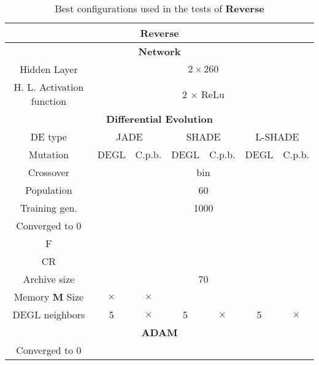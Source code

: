 \begin{table}[!h]
	\centering
	\begin{tabular}{|c|c|c|c|c|c|c|}
		\hline
		\multicolumn{7}{|c|}{\textbf{Reverse}} \\ \hline \hline
		\multicolumn{7}{|c|}{\textbf{Network}} \\ \hline
		Hidden Layer & \multicolumn{6}{c|}{$2 \times 260$}\\ \hline
		H. L. Activation function & \multicolumn{6}{c|}{2 $\times$ ReLu}\\ \hline \hline
		\multicolumn{7}{|c|}{\textbf{Differential Evolution}} \\ \hline
		DE type & \multicolumn{2}{c|}{JADE} & \multicolumn{2}{c|}{SHADE} & \multicolumn{2}{c|}{L-SHADE}  \\ \hline
		Mutation & DEGL & C.p.b. & DEGL & C.p.b. & DEGL & C.p.b. \\ \hline
		Crossover & \multicolumn{6}{c|}{bin} \\ \hline
		Population & \multicolumn{6}{c|}{60} \\ \hline
		Training gen. & \multicolumn{6}{c|}{1000} \\ \hline
		Converged to 0 & & & & & & \\ \hline
		F & & & & & &\\ \hline
		CR & & & & & &\\ \hline
		Archive size & \multicolumn{6}{c|}{70} \\ \hline
		Memory \textbf{M} Size & $\times$ & $\times$ & & & &\\ \hline
		DEGL neighbors & 5 & $\times$ & 5 & $\times$ & 5 & $\times$  \\ \hline\hline
		\multicolumn{7}{|c|}{\textbf{ADAM}} \\ \hline
		Converged to 0 & \multicolumn{6}{|c|}{\checkmark} \\ \hline
 	\end{tabular}
	\caption{Best configurations used in the tests of \textbf{Reverse}}
	\label{tbl:tests-configurations-reverse}
\end{table}

